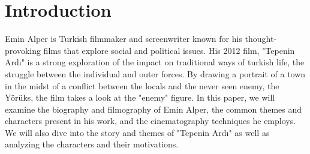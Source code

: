 \documentclass[12pt]{article}
\begin{document}
\maketitle

\section{Introduction}

\par
Emin Alper is Turkish filmmaker and screenwriter known for his thought-provoking films that explore social and political issues.
His 2012 film, "Tepenin Ardı" is a strong exploration of the impact on traditional ways of turkish life, the struggle between the individual and outer forces.
By drawing a portrait of a town in the midst of a conflict between the locals and the never seen enemy, the Yörüks, the film takes a look at the "enemy" figure.
In this paper, we will examine the biography and filmography of Emin Alper, the common themes and characters present in his work, and the cinematography techniques he employs.
We will also dive into the story and themes of "Tepenin Ardı" as well as analyzing the characters and their motivations.
\\
\end{document}
